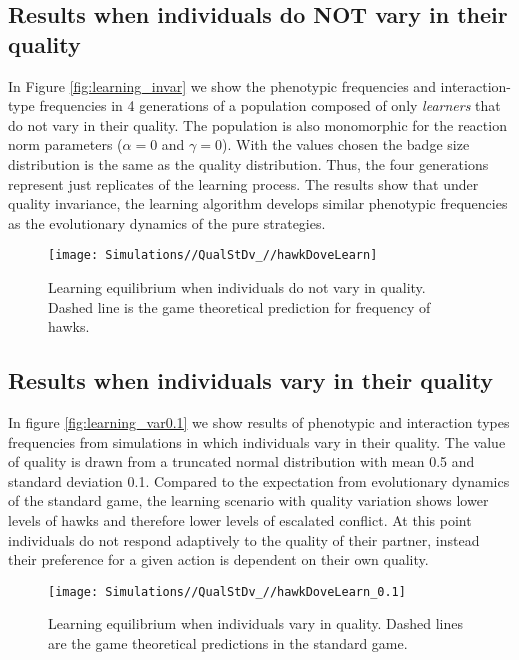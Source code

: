 \documentclass[]{article}
\begin{document}
\subsection{Results when individuals do NOT vary in their
quality}\label{results-when-individuals-do-not-vary-in-their-quality}

In Figure \ref{fig:learning_invar} we show the phenotypic frequencies
and interaction-type frequencies in 4 generations of a population
composed of only \emph{learners} that do not vary in their quality. The
population is also monomorphic for the reaction norm parameters
(\(\alpha=0\) and \(\gamma=0\)). With the values chosen the badge size
distribution is the same as the quality distribution. Thus, the four
generations represent just replicates of the learning process. The
results show that under quality invariance, the learning algorithm
develops similar phenotypic frequencies as the evolutionary dynamics of
the pure strategies.

\begin{figure}
\texttt{[image: Simulations//QualStDv\_//hawkDoveLearn]} \caption{\label{fig:learning_invar}Learning equilibrium when individuals do not vary in quality. Dashed line is the  game theoretical prediction for frequency of hawks.}\label{fig:fig3}
\end{figure}

\subsection{Results when individuals vary in their
quality}\label{results-when-individuals-vary-in-their-quality}

In figure \ref{fig:learning_var0.1} we show results of phenotypic and
interaction types frequencies from simulations in which individuals vary
in their quality. The value of quality is drawn from a truncated normal
distribution with mean 0.5 and standard deviation 0.1. Compared to the
expectation from evolutionary dynamics of the standard game, the
learning scenario with quality variation shows lower levels of hawks and
therefore lower levels of escalated conflict. At this point individuals
do not respond adaptively to the quality of their partner, instead their
preference for a given action is dependent on their own quality.

\begin{figure}
\texttt{[image: Simulations//QualStDv\_//hawkDoveLearn\_0.1]} \caption{\label{fig:learning_var0.1}Learning equilibrium when individuals vary in quality. Dashed lines are the  game theoretical predictions in the standard game.}\label{fig:fig4}
\end{figure}
\end{document}
